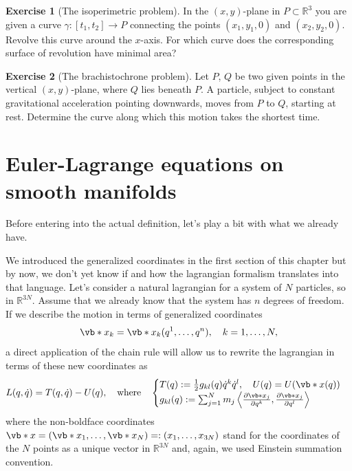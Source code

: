 \documentclass[english,fontsize=11pt,paper=b5]{scrbook}
\theoremstyle{definition}
\newtheorem{exercise}{Exercise}[chapter]
\begin{document}
    \begin{exercise}[The isoperimetric problem]
      In the $(x,y)$-plane in $P\subset \mathbb{R}^3$ you are given a curve $\gamma:[t_1,t_2]\to P$ connecting the points $(x_1, y_1, 0)$ and $(x_2, y_2, 0)$. Revolve this curve around the $x$-axis.
      For which curve does the corresponding surface of revolution have minimal area?
    \end{exercise}

    \begin{exercise}[The brachistochrone problem]
      Let $P$, $Q$ be two given points in the vertical $(x,y)$-plane, where $Q$ lies beneath $P$.
      A particle, subject to constant gravitational acceleration pointing downwards, moves from $P$ to $Q$, starting at rest.
      Determine the curve along which this motion takes the shortest time.
    \end{exercise}

    \section{Euler-Lagrange equations on smooth manifolds}\label{sec:lagrangianonmanifold}

    Before entering into the actual definition, let's play a bit with what we already have.

    We introduced the generalized coordinates in the first section of this chapter but by now, we don't yet know if and how the lagrangian formalism translates into that language.
    Let's consider a natural lagrangian for a system of $N$ particles, so in $\mathbb{R}^{3N}$.
    Assume that we already know that the system has $n$ degrees of freedom.
    If we describe the motion in terms of generalized coordinates
    \begin{equation}
      \vb*{x}_k = \vb*{x}_k(q^1, \ldots, q^{n}), \quad k=1,\ldots,N,
    \end{equation}
    a direct application of the chain rule will allow us to rewrite the lagrangian in terms of these new coordinates as
    \begin{equation}
      L(q, \dot q) = T(q, \dot q) - U(q),
      \quad\mbox{where}\quad
      \begin{cases}
        T(q):= \frac12 g_{kl}(q)\dot q^k \dot q^l, \quad U(q) = U(\vb*{x}(q)) \\
        g_{kl} (q) := \sum_{j=1}^{N} m_{j} \left\langle\frac{\partial \vb*{x}_j}{\partial q^k}, \frac{\partial \vb*{x}_j}{\partial q^l}\right\rangle
      \end{cases}
    \end{equation}
    where the non-boldface coordinates $\vb*{x} = (\vb*{x}_1, \ldots, \vb*{x}_N) =: (x_1, \ldots, x_{3N})$ stand for the coordinates of the $N$ points as a unique vector in $\mathbb{R}^{3N}$ and, again, we used Einstein summation convention.
\end{document}
